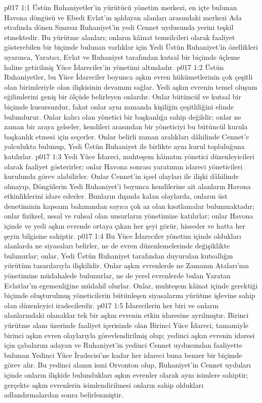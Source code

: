 \vs p017 1:1 Üstün Ruhaniyetler’in yürütücü yönetim merkezi, en içte bulunan Havona döngüsü ve Ebedi Evlat’ın ışıldayan alanları arasındaki merkezi Ada etrafında dönen Sınırsız Ruhaniyet’in yedi Cennet uydusunda yerini teşkil etmektedir. Bu yürütme alanları; onların kâinat temsilcileri olarak faaliyet gösterebilen bir biçimde bulunan varlıklar için Yedi Üstün Ruhaniyet’in özellikleri uyarınca, Yaratıcı, Evlat ve Ruhaniyet tarafından kutsal bir biçimde üçleme haline getirilmiş Yüce İdareciler’in yönetimi altındadır.
\vs p017 1:2 Üstün Ruhaniyetler, bu Yüce İdareciler boyunca aşkın evren hükümetlerinin çok çeşitli olan birimleriyle olan ilişkisinin devamını sağlar. Yedi aşkın evrenin temel oluşum eğilimlerini geniş bir ölçüde belirleyen onlardır. Onlar bütüncül ve kutsal bir biçimde kusursuzdur, fakat onlar aynı zamanda kişiliğin çeşitliliğini elinde bulundurur. Onlar kalıcı olan yönetici bir başkanlığa sahip değildir; onlar ne zaman bir araya gelseler, kendileri arasından bir yöneticiyi bu bütüncül kurula başkanlık etmesi için seçerler. Onlar belirli zaman aralıkları dâhilinde Cennet’e yolculukta bulunup, Yedi Üstün Ruhaniyet ile birlikte aynı kurul topluluğuna katılırlar.
\vs p017 1:3 Yedi Yüce İdareci, muhteşem kâinatın yönetici düzenleyicileri olarak faaliyet gösterirler; onlar Havona sonrası yaratımın idareci yöneticileri kurulunda görev alabilirler. Onlar Cennet’in içsel olayları ile ilişki dâhilinde olmayıp, Döngülerin Yedi Ruhaniyet’i boyunca kendilerine ait alanların Havona etkinliklerini idare ederler. Bunların dışında kalan olaylarda, onların üst denetiminin kapsamı bakımından sayıca çok az olan kısıtlamalar bulunmaktadır; onlar fiziksel, ussal ve ruhsal olan unsurların yönetimine katılırlar; onlar Havona içinde ve yedi aşkın evrende ortaya çıkan her şeyi görür, hisseder ve hatta her şeyin bilgisine sahiptir.
\vs p017 1:4 Bu Yüce İdareciler yönetim içinde oldukları alanlarda ne siyasaları belirler, ne de evren düzenlemelerinde değişiklikte bulunurlar; onlar, Yedi Üstün Ruhaniyet tarafından duyurulan kutsallığın yürütüm tasarılarıyla ilişkilidir. Onlar aşkın evrenlerde ne Zamanın Ataları’nın yönetimine müdahalede bulunurlar, ne de yerel evrenlerde bulan Yaratan Evlatlar’ın egemenliğine müdahil olurlar. Onlar, muhteşem kâinat içinde gerektiği biçimde oluşturulmuş yöneticilerin bütünleşen siyasalarını yürütme işlevine sahip olan düzenleyici iradecilerdir.
\vs p017 1:5 İdarecilerin her biri ve onların alanlarındaki olanaklar tek bir aşkın evrenin etkin idaresine ayrılmıştır. Birinci yürütme alanı üzerinde faaliyet içerisinde olan Birinci Yüce İdareci, tamamiyle birinci aşkın evren olaylarıyla görevlendirilmiş olup; yedinci aşkın evrenin idaresi için çabalarını adayan ve Ruhaniyet’in yedinci Cennet uydusundan faaliyette bulunan Yedinci Yüce İradecisi’ne kadar her idareci buna benzer bir biçimde görev alır. Bu yedinci alanın ismi Orvonton olup, Ruhaniyet’in Cennet uyduları içinde onların ilişkide bulundukları aşkın evrenler olarak aynı isimlere sahiptir; gerçekte aşkın evrenlerin isimlendirilmesi onların sahip oldukları adlandırmalardan sonra belirlenmiştir.
